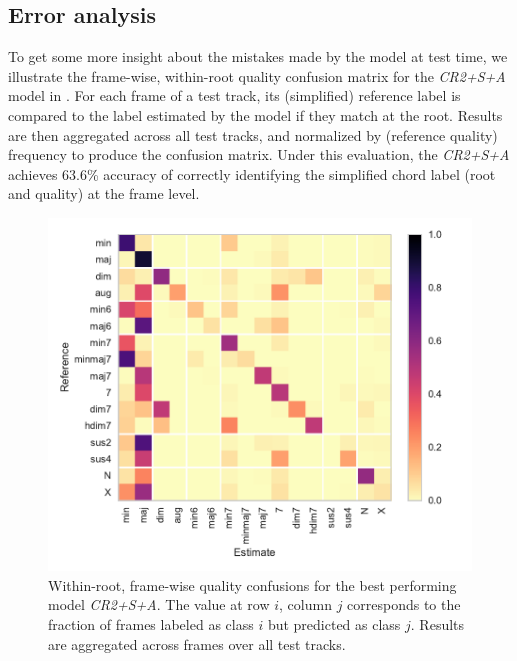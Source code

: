 \documentclass{article}
\begin{document}
\subsection{Error analysis}

To get some more insight about the mistakes made by the model at test time, we illustrate the frame-wise, within-root quality confusion matrix for the \emph{CR2+S+A} model in .
For each frame of a test track, its (simplified) reference label is compared to the label estimated by the model if they match at the root.
Results are then aggregated across all test tracks, and normalized by (reference quality) frequency to produce the confusion matrix.
Under this evaluation, the \emph{CR2+S+A} achieves 63.6\% accuracy of correctly identifying the simplified chord label (root and quality) at the frame level.

\begin{figure}
    \centering
    \includegraphics[width=\columnwidth]{qualconf}
    \caption{Within-root, frame-wise quality confusions for the best performing model \emph{CR2+S+A}.
    The value at row $i$, column $j$ corresponds to the fraction of frames labeled as class $i$ but predicted as class $j$.
    Results are aggregated across frames over all test tracks.\label{fig:confusion}}
\end{figure}
\end{document}
